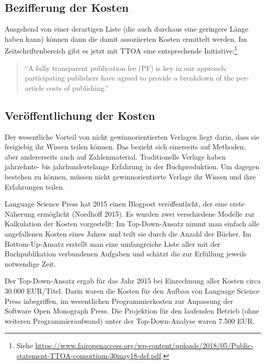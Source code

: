 \documentclass[a4paper,
fontsize=11pt,
oneside,
numbers=noperiodatend,
parskip=half-,
bibliography=totoc,
final
]{scrartcl}
\begin{document}
\hypertarget{bezifferung-der-kosten}{%
\subsection{Bezifferung der Kosten}\label{bezifferung-der-kosten}}

Ausgehend von einer derartigen Liste (die auch durchaus eine geringere
Länge haben kann) können dann die damit assoziierten Kosten ermittelt
werden. Im Zeitschriftenbereich gibt es jetzt mit TTOA eine
entsprechende Initiative:\footnote{Siehe
  \url{https://www.fairopenaccess.org/wp-content/uploads/2018/05/Public-statement-TTOA-consortium-30may18-def.pdf}.}

\begin{quote}
\enquote{A fully transparent publication fee (PF) is key in our
approach: participating publishers have agreed to provide a breakdown of
the per-article costs of publishing.}
\end{quote}

\hypertarget{veruxf6ffentlichung-der-kosten}{%
\subsection{Veröffentlichung der
Kosten}\label{veruxf6ffentlichung-der-kosten}}

Der wesentliche Vorteil von nicht gewinnorientierten Verlagen liegt
darin, dass sie freigiebig ihr Wissen teilen können. Das bezieht sich
einerseits auf Methoden, aber andererseits auch auf Zahlenmaterial.
Traditionelle Verlage haben jahrzehnte- bis jahrhundertelange Erfahrung
in der Buchproduktion. Um dagegen bestehen zu können, müssen nicht
gewinnorientierte Verlage ihr Wissen und ihre Erfahrungen teilen.

Language Science Press hat 2015 einen Blogpost veröffentlicht, der eine
erste Näherung ermöglicht (Nordhoff 2015). Es wurden zwei verschiedene
Modelle zur Kalkulation der Kosten vorgestellt: Im Top-Down-Ansatz nimmt
man einfach alle angefallenen Kosten eines Jahres und teilt sie durch
die Anzahl der Bücher. Im Bottom-Up-Ansatz erstellt man eine
umfangreiche Liste aller mit der Buchpublikation verbundenen Aufgaben
und schätzt die zur Erfüllung jeweils notwendige Zeit.

Der Top-Down-Ansatz ergab für das Jahr 2015 bei Einrechnung aller Kosten
circa 30.000 EUR/Titel. Darin waren die Kosten für den Aufbau von
Language Science Press inbegriffen, im wesentlichen Programmierkosten
zur Anpassung der Software Open Monograph Press. Die Projektion für den
laufenden Betrieb (ohne weiteren Programmieraufwand) unter der
Top-Down-Analyse waren 7.500 EUR.
\end{document}
